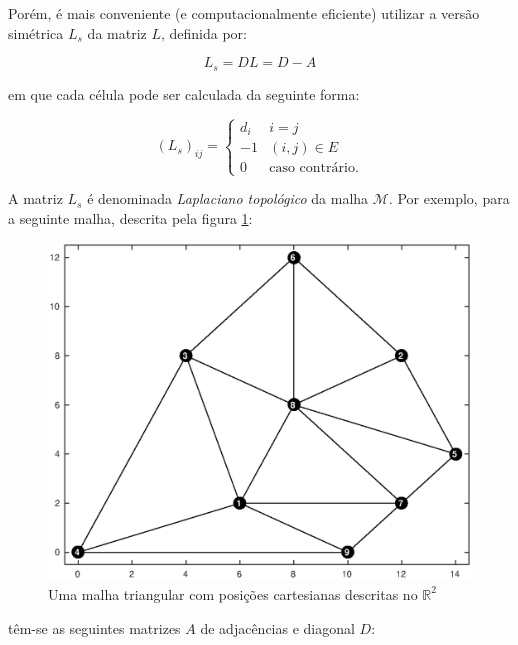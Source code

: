 Porém, é mais conveniente (e computacionalmente eficiente) utilizar a versão simétrica $L_s$ da matriz $L$, definida por:

\begin{equation}\label{eqMatLaplaciana}
L_s = DL = D - A
\end{equation}

\noindent em que cada célula pode ser calculada da seguinte forma:

\begin{equation}
(L_s)_{ij} = \begin{cases}
d_i&i=j\\
-1&(i, j) \in E\\
0&\text{caso contrário.}
\end{cases}
\end{equation}

A matriz $L_s$ é denominada \textit{Laplaciano topológico} da malha $\mathcal M$. Por exemplo, para a seguinte malha, descrita pela figura \ref{fig:origmesh}:

\begin{figure}[ht!]
	\centering
	\includegraphics[width=.6\linewidth]{imagens/cap4/grafo.eps}
	\caption{Uma malha triangular com posições cartesianas descritas no $\mathbb{R}^2$}
	\label{fig:origmesh}
\end{figure}

\noindent têm-se as seguintes matrizes $A$ de adjacências e diagonal $D$:

